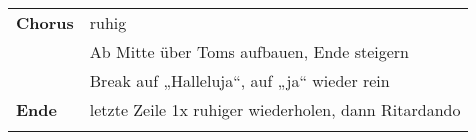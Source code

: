 \begin{tabular}{p{1.6cm}l}
	\textbf{Chorus} & ruhig                                                     \\
	                & Ab Mitte über Toms aufbauen, Ende \viertel steigern       \\
	                & Break auf „Halleluja“, auf „ja“ wieder rein               \\
	\textbf{Ende}   & letzte Zeile 1x ruhiger wiederholen, dann Ritardando      \\
	                &                                                           \\
\end{tabular}
